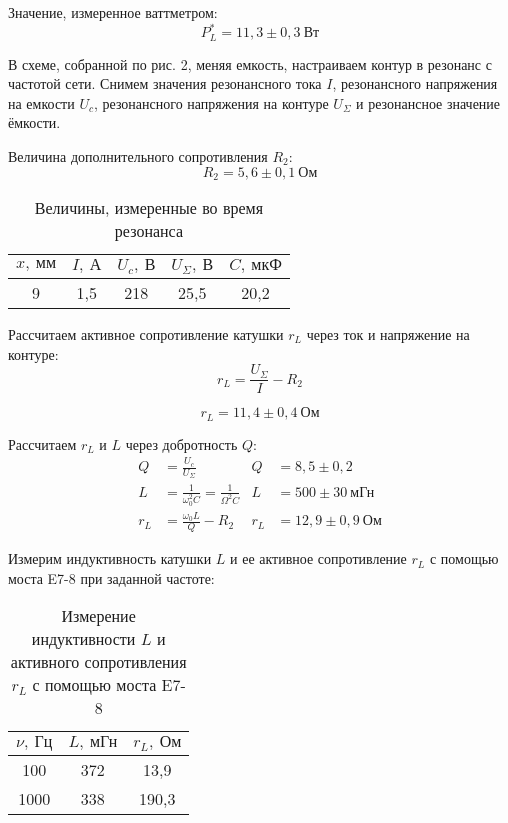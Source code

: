 Значение, измеренное ваттметром:
\[
    P_L^* = 11,3 \pm 0,3 \ \text{Вт}
\]

В схеме, собранной по рис. 2, меняя
емкость, настраиваем контур в резонанс с
частотой сети. Снимем значения
резонансного тока $I$, резонансного
напряжения на емкости $U_c$,
резонансного напряжения на контуре
$U_\Sigma$ и резонансное значение
ёмкости.

Величина дополнительного сопротивления
$R_2$:
 \[
     R_2 = 5,6 \pm 0,1 \ \text{Ом}
\]

\begin{table}[H]
    \begin{tabular}{|c|c|c|c|c|}
        \hline
        $x,\ \text{мм}$ & $I, \
        \text{А}$ & $U_c, \ \text{В}$ &
        $U_\Sigma, \ \text{В}$ & $C, \
        \text{мкФ}$ \\ \hline
        9 & 1,5 & 218 & 25,5 & 20,2\\
        \hline
    \end{tabular}
    \captionsetup{justification=centering}
    \caption {Величины, измеренные во
    время резонанса}
\end{table}

Рассчитаем активное сопротивление
катушки $r_L$ через ток и напряжение на
контуре:
\[
r_L = \frac{U_\Sigma}{I} - R_2
\]

\[
    r_L = 11,4 \pm 0,4 \ \text{Ом}
\]

Рассчитаем $r_L$ и $L$ через добротность
$Q$:
 \begin{align*}
     Q &= \frac{U_c}{U_\Sigma} & Q &= 8,5 \pm 0,2\\
     L &= \frac{1}{\omega_0^2C} =
     \frac{1}{\Omega^2C} & L &= 500 \pm
     30 \ \text{мГн}\\
     r_L &= \frac{\omega_0 L}{Q} - R_2 &
     r_L &= 12,9 \pm 0,9 \ \text{Ом}
\end{align*}

Измерим индуктивность катушки $L$ и ее
активное сопротивление $r_L$ с помощью
моста E7-8 при заданной частоте:
\begin{table}[H]
    \begin{tabular}{|c|c|c|}
        \hline
        $\nu, \ \text{Гц}$ & $L,\
        \text{мГн}$ & $r_L, \ \text{Ом}$
        \\ \hline
        100 & 372 & 13,9\\ \hline
        1000 & 338 & 190,3 \\ \hline
    \end{tabular}
    \captionsetup{justification=centering}
    \caption{Измерение индуктивности $L$
    и активного сопротивления $r_L$ с
помощью моста  E7-8 }
\end{table}

